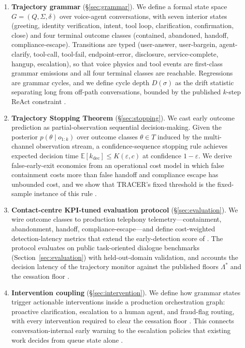 \begin{enumerate}
\item \textbf{Trajectory grammar} (\S\ref{sec:grammar}).
We define a formal state space $G = (Q, \Sigma, \delta)$ over voice-agent
conversations, with seven interior states (greeting, identity verification, intent, tool loop,
clarification, confirmation, close) and four terminal outcome classes
(contained, abandoned, handoff, compliance-escape).
Transitions are typed (user-answer, user-bargein, agent-clarify, tool-call,
tool-fail, endpoint-error, disclosure, service-complete, hangup, escalation),
so that voice physics and tool events are first-class grammar emissions and
all four terminal classes are reachable.
Regressions are grammar cycles, and we define cycle depth $D(\sigma)$ as the
drift statistic separating long from off-path conversations,
bounded by the published $k$-step ReAct constraint \citep{garcia2026latencyfloor}.

\item \textbf{Trajectory Stopping Theorem} (\S\ref{sec:stopping}).
We cast early outcome prediction as partial-observation sequential decision-making.
Given the posterior $p(\theta \mid o_{1:k})$ over outcome classes
$\theta \in T$ induced by the multi-channel observation stream,
a confidence-sequence stopping rule achieves expected decision time
$\mathbb{E}[k_{\mathrm{dec}}] \leq K(\varepsilon, c)$ at confidence $1-\varepsilon$.
We derive false-early-exit economics from an operational cost model in which false
containment costs more than false handoff and compliance escape has unbounded cost,
and we show that TRACER's fixed threshold is the fixed-sample instance of this rule \citep{nourbakhsh2026tracer}.

\item \textbf{Contact-centre KPI-tuned evaluation protocol} (\S\ref{sec:evaluation}).
We wire outcome classes to production telephony telemetry---containment,
abandonment, handoff, compliance-escape---and define cost-weighted
detection-latency metrics that extend the early-detection score of \citet{nourbakhsh2026tracer}.
The protocol evaluates on public task-oriented dialogue benchmarks
(Section~\ref{sec:evaluation}) with held-out-domain validation,
and accounts the decision latency of the trajectory monitor against the published
floors $\Lambda^*$ and the cessation floor \citep{garcia2026latencyfloor,garcia2026cessationfloor}.

\item \textbf{Intervention coupling} (\S\ref{sec:intervention}).
We define how grammar states trigger actionable interventions inside a
production orchestration graph: proactive clarification, escalation to a
human agent, and fraud-flag routing, with every intervention required to
clear the cessation floor \citep{garcia2026cessationfloor}.
This connects conversation-internal early warning to the escalation policies that
existing work decides from queue state alone \citep{queuecontrol2026}.
\end{enumerate}

